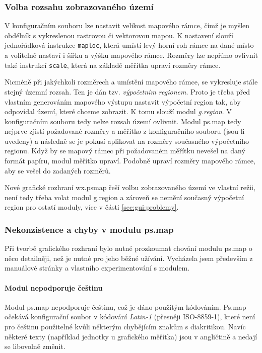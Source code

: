 \documentclass[a4paper,12pt,draft]{article}
\newcommand{\instr}[1]{\lstinline[style=psmapInline]|#1|}
\begin{document}
{\subsubsection{Volba rozsahu zobrazovaného území}
\label{sec:psmap:rozsah}
V konfiguračním souboru lze nastavit velikost mapového rámce, čímž je
myšlen obdélník s vykreslenou rastrovou či vektorovou mapou.  K nastavení
slouží jednořádková instrukce \instr{maploc}, která umístí levý
horní roh rámce na dané místo a volitelně nastaví i šířku a
výšku mapového rámce. Rozměry lze nepřímo ovlivnit také instrukcí
\instr{scale}, která na základě měřítka upraví rozměry rámce.

Nicméně při jakýchkoli rozměrech a umístění mapového rámce, se
vykresluje stále stejný územní rozsah. Ten je dán tzv. \emph{výpočetním
regionem}. Proto je třeba před vlastním generováním mapového výstupu
nastavit výpočetní region tak, aby odpovídal území, které chceme
zobrazit. K tomu slouží modul \emph{g.region}. V konfiguračním souboru
tedy nelze rozsah území ovlivnit.
Modul ps.map tedy nejprve zjistí požadované rozměry a měřítko
z konfiguračního souboru (jsou-li uvedeny) a následně se je pokusí
aplikovat na rozměry současného výpočetního regionu. Když by se mapový
rámec při požadovaném měřítku nevešel na daný formát papíru,
modul měřítko upraví. Podobně upraví rozměry mapového rámce, aby
se vešel do zadaných rozměrů.

Nové grafické rozhraní wx.psmap řeší volbu zobrazovaného území ve
vlastní režii, není tedy třeba volat modul g.region a zároveň
se nemění současný výpočetní region pro ostatí moduly, více v části
\ref{sec:gui:problemy}.

\subsubsection{Nekonzistence a chyby v modulu ps.map}
\label{sec:psmap:chyby}
Při tvorbě grafického rozhraní bylo nutné prozkoumat chování
modulu ps.map o něco detailněji, než je nutné pro jeho běžné
užívání. Vycházela jsem především z manuálové stránky \cite{manual}
a vlastního experimentování s modulem.

\paragraph*{Modul nepodporuje češtinu}
\label{sec:psmap:cestina}
Modul ps.map nepodporuje češtinu, což je dáno použitým
kódováním. Ps.map očekává konfigurační soubor v kódování
\emph{Latin-1} (přesněji ISO-8859-1), které není pro češtinu použitelné
kvůli některým chybějícím znakům s diakritikou. Navíc některé texty
(například jednotky u grafického měřítka) jsou v angličtině a nedají se
libovolně změnit.

}
\end{document}
